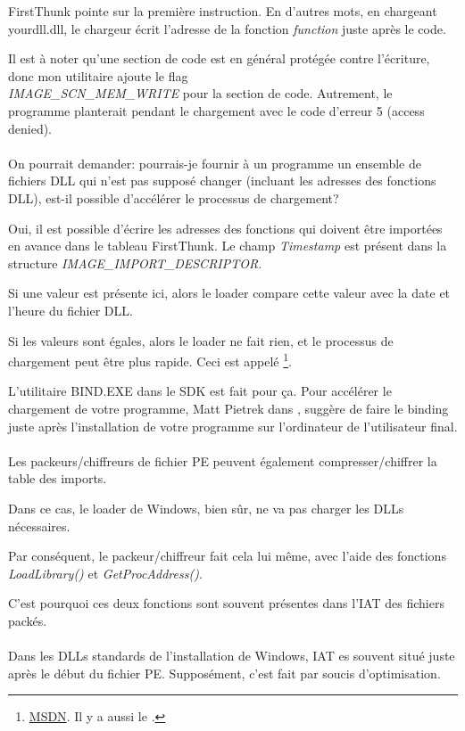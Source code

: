 FirstThunk pointe sur la première instruction. En d'autres mots, en chargeant yourdll.dll,
le chargeur écrit l'adresse de la fonction \emph{function} juste après le code.

Il est à noter qu'une section de code est en général protégée contre l'écriture,
donc mon utilitaire ajoute le flag \\
\emph{IMAGE\_SCN\_MEM\_WRITE}
pour la section de code. Autrement, le programme planterait pendant le chargement
avec le code d'erreur 5 (access denied). \\
\\
On pourrait demander: pourrais-je fournir à un programme un ensemble de fichiers
DLL qui n'est pas supposé changer (incluant les adresses des fonctions DLL), est-il
possible d'accélérer le processus de chargement?

Oui, il est possible d'écrire les adresses des fonctions qui doivent être importées
en avance dans le tableau FirstThunk. Le champ \emph{Timestamp} est présent dans la
structure \emph{IMAGE\_IMPORT\_DESCRIPTOR}.

Si une valeur est présente ici, alors le loader compare cette valeur avec la date
et l'heure du fichier DLL.

Si les valeurs sont égales, alors le loader ne fait rien, et le processus de chargement
peut être plus rapide.
Ceci est appelé 
\footnote{\href{http://go.yurichev.com/17050}{MSDN}. Il y a aussi le .}.

L'utilitaire BIND.EXE dans le SDK est fait pour ça.
Pour accélérer le chargement de votre programme, Matt Pietrek dans \PietrekPEURL,
suggère de faire le binding juste après l'installation de votre programme sur l'ordinateur
de l'utilisateur final. \\
\\
Les packeurs/chiffreurs de fichier PE peuvent également compresser/chiffrer la table
des imports.

Dans ce cas, le loader de Windows, bien sûr, ne va pas charger les DLLs nécessaires.

Par conséquent, le packeur/chiffreur fait cela lui même, avec l'aide des fonctions
\emph{LoadLibrary()} et \emph{GetProcAddress()}.

C'est pourquoi ces deux fonctions sont souvent présentes dans l'\ac{IAT} des fichiers
packés.\\
\\
Dans les DLLs standards de l'installation de Windows, \ac{IAT} es souvent situé juste
après le début du fichier PE.
Supposément, c'est fait par soucis d'optimisation.

